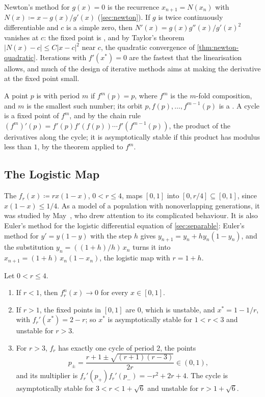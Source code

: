 Newton's method for $g(x)=0$ is the recurrence $x_{n+1}=N(x_n)$ with $N(x)\coloneqq x-g(x)/g'(x)$ (\cref{sec:newton}). If $g$ is twice continuously differentiable and $c$ is a simple zero, then $N'(x)=g(x)g''(x)/g'(x)^2$ vanishes at $c$: the fixed point is , and by Taylor's theorem $|N(x)-c|\le C|x-c|^2$ near $c$, the quadratic convergence of \cref{thm:newton-quadratic}. Iterations with $f'(x^*)=0$ are the fastest that the linearisation allows, and much of the design of iterative methods aims at making the derivative at the fixed point small.

A point $p$ is  with period $m$ if $f^m(p)=p$, where $f^m$ is the $m$-fold composition, and $m$ is the smallest such number; its orbit $p,f(p),\ldots,f^{m-1}(p)$ is a . A cycle is a fixed point of $f^m$, and by the chain rule $(f^m)'(p)=f'(p)f'(f(p))\cdots f'(f^{m-1}(p))$, the product of the derivatives along the cycle; it is asymptotically stable if this product has modulus less than $1$, by the theorem applied to $f^m$.

\subsection{The Logistic Map}

The  $f_r(x)\coloneqq rx(1-x)$, $0<r\le4$, maps $[0,1]$ into $[0,r/4]\subseteq[0,1]$, since $x(1-x)\le1/4$. As a model of a population with nonoverlapping generations, it was studied by May~\cite{may1976}, who drew attention to its complicated behaviour. It is also Euler's method for the logistic differential equation of \cref{sec:separable}: Euler's method for $y'=y(1-y)$ with the step $h$ gives $y_{n+1}=y_n+hy_n(1-y_n)$, and the substitution $y_n=((1+h)/h)\,x_n$ turns it into $x_{n+1}=(1+h)\,x_n(1-x_n)$, the logistic map with $r=1+h$.

\begin{proposition}
\label{prop:logistic-two-cycle}
Let $0<r\le4$.
\begin{enumerate}
\item If $r<1$, then $f_r^n(x)\to0$ for every $x\in[0,1]$.
\item If $r>1$, the fixed points in $[0,1]$ are $0$, which is unstable, and $x^*=1-1/r$, with $f_r'(x^*)=2-r$; so $x^*$ is asymptotically stable for $1<r<3$ and unstable for $r>3$.
\item For $r>3$, $f_r$ has exactly one cycle of period $2$, the points
\[
p_\pm=\frac{r+1\pm\sqrt{(r+1)(r-3)}}{2r}\in(0,1),
\]
and its multiplier is $f_r'(p_+)f_r'(p_-)=-r^2+2r+4$. The cycle is asymptotically stable for $3<r<1+\sqrt6$ and unstable for $r>1+\sqrt6$.
\end{enumerate}
\end{proposition}

